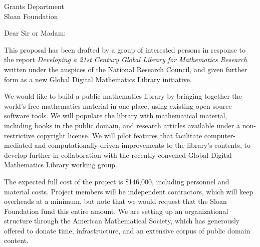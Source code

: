 \documentclass{letter}
\begin{document}
\signature{Volker Sorge\\ \emph{for the GDML Consortium}}
\address{Volker Sorge\\
School of Computer Science\\
University of Birmingham\\
B15 2TT, UK}
\begin{letter}{Grants Department \\ Sloan Foundation}
\opening{Dear Sir or Madam:}


This proposal has been drafted by a group of interested persons in
response to the report \emph{Developing a 21st Century Global Library
  for Mathematics Research} written under the auspices of the National
Research Council, and given further form as a new Global Digital
Mathematics Library initiative.

We would like to build a public mathematics library by bringing
together the world's free mathematics material in one place, using
existing open source software tools.
%
We will populate the library with mathematical material, including
books in the public domain, and research articles available under a
non-restrictive copyright license.
%
We will pilot features that facilitate computer-mediated and
computationally-driven improvements to the library's contents, to
develop further in collaboration with the recently-convened Global
Digital Mathematics Library working group.


The expected full cost of the project is \$146,000, including
personnel and material costs.  Project members will be independent
contractors, which will keep overheads at a minimum, but note that we
would request that the Sloan Foundation fund this entire amount.  We
are setting up an organizational structure through the American
Mathematical Society, which has generously offered to donate time,
infrastructure, and an extensive corpus of public domain content.


\end{letter}
\end{document}
